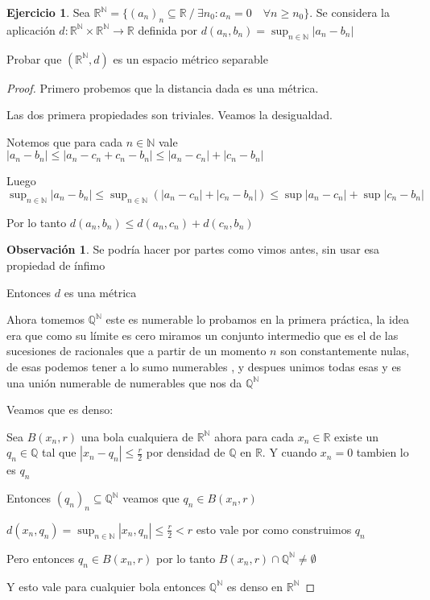 \documentclass[11pt]{report}
\newcommand{\Q}{\mathbb{Q}}
\newcommand{\R}{\mathbb{R}}
\newcommand{\N}{\mathbb{N}}
\theoremstyle{definition}
\newtheorem*{remark}{Observación}
\newtheorem{ej}{Ejercicio}
\begin{document}
\begin{ej}
	Sea $\R^{\N} = \{(a_n)_n \subseteq \R \ / \ \exists n_0:a_n =0 \quad \forall n \geq n_0\}$. Se considera la aplicación $d: \R^{\N} \times \R^{\N} \longrightarrow \R$ definida por $d(a_n,b_n) = \sup_{n \in \N} |a_n - b_n|$
	
	\noindent Probar que $(\R^{\N},d)$ es un espacio métrico separable
	\begin{proof}
		Primero probemos que la distancia dada es una métrica.

		Las dos primera propiedades son triviales. Veamos la desigualdad. 

		Notemos que para cada $n\in\N$ vale $|a_n - b_n| \leq |a_n - c_n + c_n -b_n| \leq |a_n - c_n| + |c_n -b_n|$ 

		Luego $\sup_{n\in\N} |a_n - b_n| \leq \sup_{n\in\N} (|a_n -c_n| + |c_n - b_n| ) \leq \sup |a_n - c_n| + \sup |c_n - b_n|$

		Por lo tanto $d(a_n,b_n) \leq d(a_n,c_n) + d(c_n,b_n)$

		\begin{remark}
			Se podría hacer por partes como vimos antes, sin usar esa propiedad de ínfimo
		\end{remark}

		Entonces $d$ es una métrica

		Ahora tomemos $\Q^{\N}$ este es numerable lo probamos en la primera práctica, la idea era que como su límite es cero miramos un conjunto intermedio que es el de las sucesiones de racionales que a partir de un momento $n$ son constantemente nulas, de esas podemos tener a lo sumo numerables , y despues unimos todas esas y es una unión numerable de numerables que nos da $\Q^{\N}$

		Veamos que es denso:

		Sea $B(x_n,r)$ una bola cualquiera de $\R^{\N}$ ahora para cada $x_n \in \R $ existe un $q_n \in \Q$ tal que $|x_n - q_n| \leq \frac{r}{2}$ por densidad de $\Q$ en $\R$. Y cuando $x_n = 0$ tambien lo es $q_n$ 

		Entonces $(q_n)_n \subseteq \Q^{\N} $ veamos que $q_n \in B(x_n,r)$

		$d(x_n,q_n) = \sup_{n\in \N} |x_n,q_n| \leq \frac{r}{2} < r$ esto vale por como construimos $q_n$

		Pero entonces $q_n \in B(x_n,r)$ por lo tanto $B(x_n,r) \cap \Q^{\N} \neq \emptyset$

		Y esto vale para cualquier bola entonces $\Q^{\N}$ es denso en $\R^{\N}$
	\end{proof}	
\end{ej}
\end{document}

